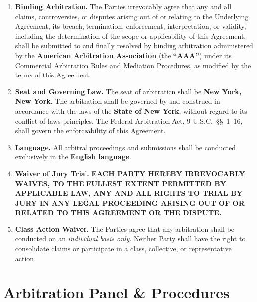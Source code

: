 \documentclass[11pt,a4paper]{article}
\begin{document}
\begin{enumerate}
  \item \textbf{Binding Arbitration.} The Parties irrevocably agree that any and
    all claims, controversies, or disputes arising out of or relating to the
    Underlying Agreement, its breach, termination, enforcement, interpretation,
    or validity, including the determination of the scope or applicability of
    this Agreement, shall be submitted to and finally resolved by binding
    arbitration administered by the \textbf{American Arbitration Association}
    (the \textbf{``AAA''}) under its Commercial Arbitration Rules and Mediation
    Procedures, as modified by the terms of this Agreement.

  \item \textbf{Seat and Governing Law.} The seat of arbitration shall be
    \textbf{New York, New York}. The arbitration shall be governed by and
    construed in accordance with the laws of the \textbf{State of New York},
    without regard to its conflict-of-laws principles. The Federal Arbitration
    Act, 9 U.S.C.\ \S\S\ 1--16, shall govern the enforceability of this
    Agreement.

  \item \textbf{Language.} All arbitral proceedings and submissions shall be
    conducted exclusively in the \textbf{English language}.

  \item \textbf{Waiver of Jury Trial.} \textbf{EACH PARTY HEREBY IRREVOCABLY
    WAIVES, TO THE FULLEST EXTENT PERMITTED BY APPLICABLE LAW, ANY AND ALL
    RIGHTS TO TRIAL BY JURY IN ANY LEGAL PROCEEDING ARISING OUT OF OR RELATED
    TO THIS AGREEMENT OR THE DISPUTE.}

  \item \textbf{Class Action Waiver.} The Parties agree that any arbitration
    shall be conducted on an \emph{individual basis only}. Neither Party shall
    have the right to consolidate claims or participate in a class, collective,
    or representative action.
\end{enumerate}

\section{Arbitration Panel \& Procedures}
\end{document}
